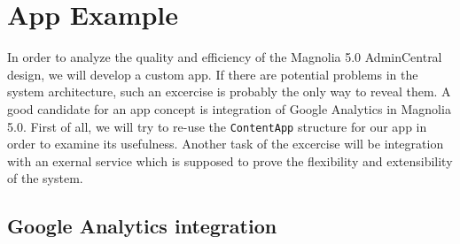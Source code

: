 \section{App Example}
In order to analyze the quality and efficiency of the Magnolia 5.0 AdminCentral
design, we will develop a custom app. If there are potential problems in the
system architecture, such an excercise is probably the only way to reveal them.
A good candidate for an app concept is integration of Google Analytics in
Magnolia 5.0.
First of all, we will try to re-use the \texttt{ContentApp} structure for our
app in order to examine its usefulness.  Another task of the excercise will be
integration with an exernal service which is supposed to prove the flexibility
and extensibility of the system.

\subsection{Google Analytics integration}